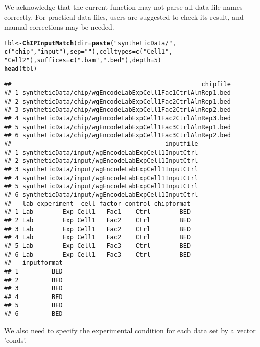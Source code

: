 \documentclass[a4paper,10pt]{article}\usepackage[]{graphicx}\usepackage[]{color}
\makeatletter
\newcommand{\hlnum}[1]{\textcolor[rgb]{0.686,0.059,0.569}{#1}}%
\newcommand{\hlstr}[1]{\textcolor[rgb]{0.192,0.494,0.8}{#1}}%
\newcommand{\hlstd}[1]{\textcolor[rgb]{0.345,0.345,0.345}{#1}}%
\newcommand{\hlkwb}[1]{\textcolor[rgb]{0.69,0.353,0.396}{#1}}%
\newcommand{\hlkwc}[1]{\textcolor[rgb]{0.333,0.667,0.333}{#1}}%
\newcommand{\hlkwd}[1]{\textcolor[rgb]{0.737,0.353,0.396}{\textbf{#1}}}%
\newenvironment{kframe}{%
 \def\at@end@of@kframe{}%
 \ifinner\ifhmode%
  \def\at@end@of@kframe{\end{minipage}}%
  \begin{minipage}{\columnwidth}%
 \fi\fi%
 \def\FrameCommand##1{\hskip\@totalleftmargin \hskip-\fboxsep
 \colorbox{shadecolor}{##1}\hskip-\fboxsep
     \hskip-\linewidth \hskip-\@totalleftmargin \hskip\columnwidth}%
 \MakeFramed {\advance\hsize-\width
   \@totalleftmargin\z@ \linewidth\hsize
   \@setminipage}}%
 {\par\unskip\endMakeFramed%
 \at@end@of@kframe}
\newenvironment{knitrout}{}{} %
\makeatother
\begin{document}
We acknowledge that the current function may not parse all data file names correctly. For practical data files, users are suggested to check its result, and manual corrections may be needed.

\begin{knitrout}
\color{fgcolor}\begin{kframe}
\begin{alltt}
\hlstd{tbl} \hlkwb{<-} \hlkwd{ChIPInputMatch}\hlstd{(}\hlkwc{dir} \hlstd{=} \hlkwd{paste}\hlstd{(}\hlstr{"syntheticData/"}\hlstd{,}
    \hlkwd{c}\hlstd{(}\hlstr{"chip"}\hlstd{,} \hlstr{"input"}\hlstd{),} \hlkwc{sep} \hlstd{=} \hlstr{""}\hlstd{),} \hlkwc{celltypes} \hlstd{=} \hlkwd{c}\hlstd{(}\hlstr{"Cell1"}\hlstd{,}
    \hlstr{"Cell2"}\hlstd{),} \hlkwc{suffices} \hlstd{=} \hlkwd{c}\hlstd{(}\hlstr{".bam"}\hlstd{,} \hlstr{".bed"}\hlstd{),} \hlkwc{depth} \hlstd{=} \hlnum{5}\hlstd{)}
\hlkwd{head}\hlstd{(tbl)}
\end{alltt}
\begin{verbatim}
##                                                    chipfile
## 1 syntheticData/chip/wgEncodeLabExpCell1Fac1CtrlAlnRep1.bed
## 2 syntheticData/chip/wgEncodeLabExpCell1Fac2CtrlAlnRep1.bed
## 3 syntheticData/chip/wgEncodeLabExpCell1Fac2CtrlAlnRep2.bed
## 4 syntheticData/chip/wgEncodeLabExpCell1Fac2CtrlAlnRep3.bed
## 5 syntheticData/chip/wgEncodeLabExpCell1Fac3CtrlAlnRep1.bed
## 6 syntheticData/chip/wgEncodeLabExpCell1Fac3CtrlAlnRep2.bed
##                                          inputfile
## 1 syntheticData/input/wgEncodeLabExpCell1InputCtrl
## 2 syntheticData/input/wgEncodeLabExpCell1InputCtrl
## 3 syntheticData/input/wgEncodeLabExpCell1InputCtrl
## 4 syntheticData/input/wgEncodeLabExpCell1InputCtrl
## 5 syntheticData/input/wgEncodeLabExpCell1InputCtrl
## 6 syntheticData/input/wgEncodeLabExpCell1InputCtrl
##   lab experiment  cell factor control chipformat
## 1 Lab        Exp Cell1   Fac1    Ctrl        BED
## 2 Lab        Exp Cell1   Fac2    Ctrl        BED
## 3 Lab        Exp Cell1   Fac2    Ctrl        BED
## 4 Lab        Exp Cell1   Fac2    Ctrl        BED
## 5 Lab        Exp Cell1   Fac3    Ctrl        BED
## 6 Lab        Exp Cell1   Fac3    Ctrl        BED
##   inputformat
## 1         BED
## 2         BED
## 3         BED
## 4         BED
## 5         BED
## 6         BED
\end{verbatim}
\end{kframe}
\end{knitrout}

We also need to specify the experimental condition for each data set by a vector 'conds'.
\end{document}
